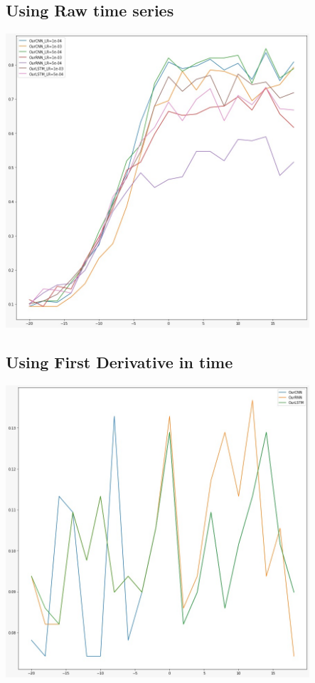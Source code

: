 \documentclass[12pt,a4paper]{article}
\begin{document}
    \subsection{Using Raw time series}
    \begin{center}
         \includegraphics[width=320pt]{imgs/graph1.jpg}
        \end{center}
        \subsection{Using First Derivative in time}
    \begin{center}
         \includegraphics[width=320pt]{imgs/dt.jpg}
        \end{center}
        \newpage
\end{document}
